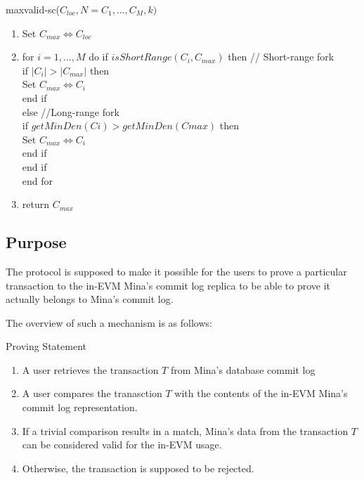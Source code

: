 \begin{algorithm}[H]
    \caption{maxvalid-sc($C_{loc}, N = {C_1, ... , C_M}, k)$}
    \begin{enumerate}
        // Compare $C_{loc}$ with each candidate chain in N
        \item Set $C_{max} \Leftrightarrow C_{loc}$
        \item for $i = 1, ... , M$ do
            if $isShortRange(C_i, C_{max})$ then // Short-range fork\\
            if $|C_i| > |C_{max}|$ then \\
            Set $C_{max} \Leftrightarrow C_{i}$ \\
            end if\\
            else //Long-range fork\\
            if $getMinDen(C𝑖) > getMinDen(Cmax)$ then \\
            Set $C_{max} \Leftrightarrow C_{i}$ \\
            end if \\
            end if \\
            end for \\
        \item return $C_{max}$
    \end{enumerate}
\end{algorithm}

\subsection{Purpose}

The protocol is supposed to make it possible for the users to prove a particular
transaction to the in-EVM Mina's commit log replica to be able to prove it
actually belongs to Mina's commit log.

The overview of such a mechanism is as follows:

\begin{algorithm}
    \caption{Proving Statement}
    \label{commitlog}
    \begin{enumerate}
        \item A user retrieves the transaction $T$ from Mina's database commit log
        \item A user compares the tranasction $T$ with the contents of the
            in-EVM Mina's commit log representation.
        \item If a trivial comparison results in a match, Mina's data from the
            transaction $T$ can be considered valid for the in-EVM usage.
        \item Otherwise, the transaction is supposed to be rejected.
    \end{enumerate}
\end{algorithm}
